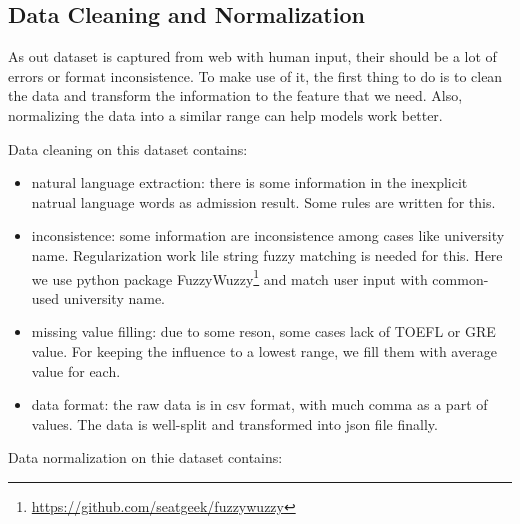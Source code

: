 \documentclass{article}
\begin{document}
\subsection{Data Cleaning and Normalization}

As out dataset is captured from web with human input, their should be a lot of errors or format inconsistence. To make use of it, the first thing to do is to clean the data and transform the information to the feature that we need. Also, normalizing the data into a similar range can help models work better.

Data cleaning on this dataset contains:

\begin{itemize}
    \item natural language extraction: there is some information in the inexplicit natrual language words as admission result. Some rules are written for this.
    \item inconsistence: some information are inconsistence among cases like university name. Regularization work lile string fuzzy matching is needed for this. Here we use python package FuzzyWuzzy\footnote{\url{https://github.com/seatgeek/fuzzywuzzy}} and match user input with common-used university name.
    \item missing value filling: due to some reson, some cases lack of TOEFL or GRE value. For keeping the influence to a lowest range, we fill them with average value for each.
    \item data format: the raw data is in csv format, with much comma as a part of values. The data is well-split and transformed into json file finally.
\end{itemize}

Data normalization on thie dataset contains:
\end{document}
